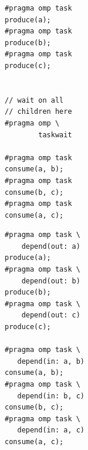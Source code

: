 \begin{figure}

\newsavebox{\firstExample}
\newsavebox{\secondExample}

\begin{lrbox}{\firstExample}
\begin{minipage}{0.45\columnwidth}
\begin{verbatim}
#pragma omp task
produce(a);
#pragma omp task
produce(b);
#pragma omp task
produce(c);


// wait on all
// children here
#pragma omp \
        taskwait

#pragma omp task
consume(a, b);
#pragma omp task
consume(b, c);
#pragma omp task
consume(a, c);
\end{verbatim}
\end{minipage}
\end{lrbox}

\begin{lrbox}{\secondExample}
\begin{minipage}{0.50\columnwidth}
\begin{verbatim}
#pragma omp task \
    depend(out: a)
produce(a);
#pragma omp task \
    depend(out: b)
produce(b);
#pragma omp task \
    depend(out: c)
produce(c);

#pragma omp task \
   depend(in: a, b)
consume(a, b);
#pragma omp task \
   depend(in: b, c)
consume(b, c);
#pragma omp task \
   depend(in: a, c)
consume(a, c);
\end{verbatim}
\end{minipage}
\end{lrbox}



\subfloat[][OpenMP 3.0]{\usebox{\firstExample}\label{fig:CodeTaskDeps3.0code}}
~
~
\subfloat[][OpenMP 4.0]{\usebox{\secondExample}\label{fig:CodeTaskDeps4.0code}}

\addtocounter{subfigure}{-1}


\end{figure}
